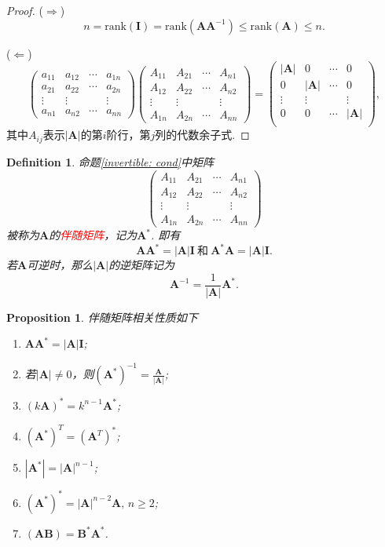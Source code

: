 \documentclass{article}
\newtheorem{proposition}[theorem]{Proposition}
\newtheorem{definition}[theorem]{Definition}
\newcommand{\mbf}[1]{\bm{#1}}
\newcommand{\rank}[1]{\text{rank}\left(#1\right)} %
\newcommand{\redt}[1]{\textcolor{red}{#1}}
\begin{document}
\begin{proof}
($\Rightarrow$)
$$
n =\rank{\mbf{I}} = \rank{\mbf{A}\mbf{A}^{-1}} \leq \rank{\mbf{A}} \leq n.
$$

($\Leftarrow$)
$$
\begin{pmatrix}
a_{11} & a_{12} & \cdots & a_{1n} \\
a_{21} & a_{22} & \cdots & a_{2n} \\
\vdots & \vdots &&\vdots \\
a_{n1} & a_{n2} & \cdots & a_{nn}
\end{pmatrix}
\begin{pmatrix}
A_{11} & A_{21} & \cdots & A_{n1} \\
A_{12} & A_{22} & \cdots & A_{n2} \\
\vdots & \vdots &&\vdots \\
A_{1n} & A_{2n} & \cdots & A_{nn}
\end{pmatrix}
=\begin{pmatrix}
|\mbf{A}| & 0 & \cdots & 0\\
0 & |\mbf{A}| & \cdots & 0\\
\vdots & \vdots &  & \vdots\\
0 & 0 & \cdots & |\mbf{A}|\\
\end{pmatrix},
$$
其中$A_{ij}$表示$|\mbf{A}|$的第$i$阶行，第$j$列的代数余子式.
\end{proof}

\begin{definition}
\rm 命题\ref{invertible: cond}中矩阵
$$
\begin{pmatrix}
A_{11} & A_{21} & \cdots & A_{n1} \\
A_{12} & A_{22} & \cdots & A_{n2} \\
\vdots & \vdots &&\vdots \\
A_{1n} & A_{2n} & \cdots & A_{nn}
\end{pmatrix}
$$
被称为$\mbf{A}$的\redt{伴随矩阵}，记为$\mbf{A}^*$. 即有
$$
\mbf{A}\mbf{A}^* = |\mbf{A}|\mbf{I}~\text{和}~\mbf{A}^*\mbf{A} = |\mbf{A}|\mbf{I}.
$$
若$\mbf{A}$可逆时，那么$|\mbf{A}|$的逆矩阵记为
$$
\mbf{A}^{-1} = \frac{1}{|\mbf{A}|}\mbf{A}^*.
$$
\end{definition}

\begin{proposition}
\rm 伴随矩阵相关性质如下
\begin{enumerate}
	\item $\mbf{A}\mbf{A}^*=|\mbf{A}|\mbf{I}$;
	\item 若$|\mbf{A}| \neq 0$，则$(\mbf{A}^*)^{-1}=\frac{\mbf{A}}{|\mbf{A}|}$;
	\item $(k\mbf{A})^* = k^{n-1}\mbf{A}^*$;
	\item $(\mbf{A}^*)^T = (\mbf{A}^T)^*$;
	\item $|\mbf{A}^*|=|\mbf{A}|^{n-1}$;
	\item $(\mbf{A}^*)^* = |\mbf{A}|^{n-2}\mbf{A},\, n \geq 2$;
	\item $(\mbf{A}\mbf{B})=\mbf{B}^*\mbf{A}^*$.
\end{enumerate}
\end{proposition}
\end{document}
